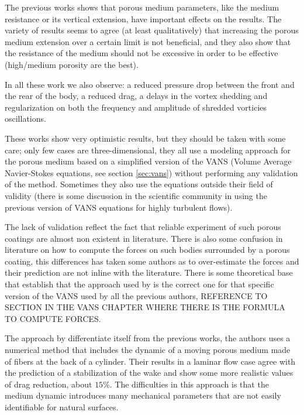 The previous works shows that porous medium parameters, like the medium resistance or its vertical extension, have important effects on the results.
The variety of results seems to agree (at least qualitatively) that increasing the porous medium extension over a certain limit is not beneficial, and they also show that the resistance of the medium should not be excessive in order to be effective (high/medium porosity are the best).

In all these work we also observe: a reduced pressure drop between the front and the rear of the body, a reduced drag, a delays in the vortex shedding and regularization on both the frequency and amplitude of shredded vorticies oscillations.

These works show very optimistic results, but they should be taken with some care; only few cases are three-dimensional, they all use a modeling approach for the porous medium based on a simplified version of the VANS (Volume Average Navier-Stokes equations, see section \ref{sec:vans}) without performing any validation of the method.
Sometimes they also use the equations outside their field of validity (there is some discussion in the scientific community in using the previous version of VANS equations for highly turbulent flows).

The lack of validation reflect the fact that reliable experiment of such porous coatings are almost non existent in literature.
There is also some confusion in literature on how to compute the forces on such bodies surrounded by a porous coating, this differences has taken some authors as\citet{naito2012numerical} to over-estimate the forces and their prediction are not inline with the literature.
There is some theoretical base \citet{caltagirone1994interaction} that establish that the approach used by \citet{bruneau2004passive} is the correct one for that specific version of the VANS used by all the previous authors, REFERENCE TO SECTION IN THE VANS CHAPTER WHERE THERE IS THE FORMULA TO COMPUTE FORCES.

The approach by \citet{favier2009passive} differentiate itself from the previous works, the authors uses a numerical method that includes the dynamic of a moving porous medium made of fibers at the back of a cylinder.
Their results in a laminar flow case agree with the prediction of a stabilization of the wake and show some more realistic values of drag reduction, about $15\%$.
The difficulties in this approach is that the medium dynamic introduces many mechanical parameters that are not easily identifiable for natural surfaces.

